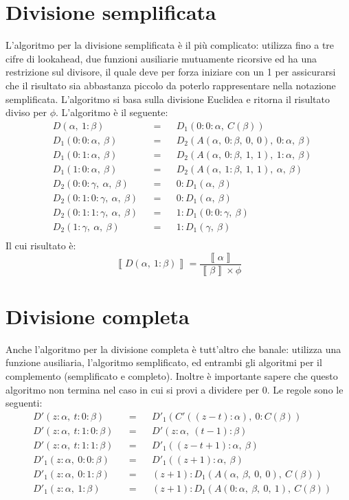 \documentclass[Lau,oneside]{sapthesis}
\begin{document}
\section{Divisione semplificata}
L'algoritmo per la divisione semplificata è il più complicato: utilizza fino a tre cifre di lookahead, due funzioni ausiliarie mutuamente ricorsive ed ha una restrizione sul divisore, il quale deve per forza iniziare con un 1 per assicurarsi che il risultato sia abbastanza piccolo da poterlo rappresentare nella notazione semplificata. L'algoritmo si basa sulla divisione Euclidea e ritorna il risultato diviso per $\phi$. L'algoritmo è il seguente:
\begin{align*}
&D(\alpha, \ 1:\beta) && = && D_1(0:0:\alpha, \ C(\beta))\\
&D_1(0:0:\alpha, \ \beta) && = && D_2(A(\alpha, \ 0:\beta, \ 0, \ 0), \ 0:\alpha, \ \beta)\\
&D_1(0:1:\alpha, \ \beta) && = && D_2(A(\alpha, \ 0:\beta, \ 1, \ 1), \ 1:\alpha, \ \beta)\\
&D_1(1:0:\alpha, \ \beta) && = && D_2(A(\alpha, \ 1:\beta, \ 1, \ 1), \ \alpha, \ \beta)\\
&D_2(0:0:\gamma, \ \alpha, \ \beta) && = && 0:D_1(\alpha, \ \beta)\\
&D_2(0:1:0:\gamma, \ \alpha, \ \beta) && = && 0:D_1(\alpha, \ \beta)\\
&D_2(0:1:1:\gamma, \ \alpha, \ \beta) && = && 1:D_1(0:0:\gamma, \ \beta)\\
&D_2(1:\gamma, \ \alpha, \ \beta) && = && 1:D_1(\gamma, \ \beta)\\
\end{align*}
Il cui risultato è:
$$\left\llbracket D(\alpha, \ 1:\beta) \right\rrbracket = \frac{\left\llbracket \alpha \right\rrbracket}{\left\llbracket \beta \right\rrbracket \times \phi}$$


\section{Divisione completa}
Anche l'algoritmo per la divisione completa è tutt'altro che banale: utilizza una funzione ausiliaria, l'algoritmo semplificato, ed entrambi gli algoritmi per il complemento (semplificato e completo). Inoltre è importante sapere che questo algoritmo non termina nel caso in cui si provi a dividere per 0. Le regole sono le seguenti:
\begin{align*}
&D'(z:\alpha, \ t:0:\beta) && = && D'_1(C'((z-t):\alpha), \ 0:C(\beta))\\
&D'(z:\alpha, \ t:1:0:\beta) && = && D'(z:\alpha, \ (t-1):\beta)\\
&D'(z:\alpha, \ t:1:1:\beta) && = && D'_1((z-t+1):\alpha, \ \beta)\\
&D'_1(z:\alpha, \ 0:0:\beta) && = && D'_1((z+1):\alpha, \ \beta)\\
&D'_1(z:\alpha, \ 0:1:\beta) && = && (z+1):D_1(A(\alpha, \ \beta, \ 0, \ 0), \ C(\beta))\\
&D'_1(z:\alpha, \ 1:\beta) && = && (z+1): D_1(A(0:\alpha, \ \beta, \ 0, \ 1), \ C(\beta))
\end{align*}
\end{document}
